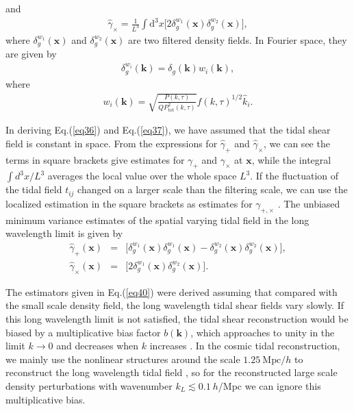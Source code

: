 \documentclass[aps,prd,twocolumn,showpacs,superscriptaddress,groupedaddress,nofootinbib]{revtex4}  %
\newcommand{\mr}{\mathrm}
\renewcommand{\d}{\mathrm{d}}
\begin{document}
and
\begin{eqnarray}
\label{eq37}
\hat{\gamma}_\times=\frac{1}{L^3}\int\d^3x
\big[2{\delta}^{w_1}_g(\bm{x}){\delta}^{w_2}_g(\bm{x})\big],
\end{eqnarray}
where ${\delta}^{w_1}_g(\bm{x})$ and ${\delta}^{w_2}_g(\bm{x})$ 
are two filtered density fields. In Fourier space, they are given by
\begin{eqnarray}
{\delta}_g^{w_i}(\bm{k})=\delta_g(\bm{k})w_i(\bm{k}),
\end{eqnarray}
where 
\begin{eqnarray}
\label{eq:filter}
w_i(\bm{k})=\sqrt{\frac{P(k,\tau)}{QP^2_\mr{tot}(k,\tau)}}
f(k,\tau)^{1/2}
\hat{k}_i.
\end{eqnarray}


In deriving Eq.(\ref{eq36}) and Eq.(\ref{eq37}), we have assumed that the tidal 
shear field is constant in space. 
From the expressions for $\hat{\gamma}_+$ and $\hat{\gamma}_\times$, we can 
see the terms in square brackets give estimates for $\gamma_+$ and 
$\gamma_\times$ at $\bm{x}$, while the integral $\int d^3x/L^3$ averages the 
local value over the whole space $L^3$.
If the fluctuation of the tidal field $t_{ij}$ changed on a larger scale than the filtering scale, 
we can use the localized estimation in the square brackets as estimates
for $\gamma_{+,\times}$ \cite{2008:lu,2010lu,2012bucher}. 
The unbiased minimum variance 
estimates of the spatial varying tidal field in the long wavelength limit is given by
\begin{eqnarray}
\label{eq40}
\hat{\gamma}_+(\bm{x})&=&
\big[{\delta}^{w_1}_g(\bm{x}){\delta}^{w_1}_g(\bm{x})-
{\delta}^{w_2}_g(\bm{x}){\delta}^{w_2}_g(\bm{x})\big],\nonumber\\
\hat{\gamma}_\times(\bm{x})&=&
\big[2{\delta}^{w_1}_g(\bm{x}){\delta}^{w_2}_g(\bm{x})\big].
\end{eqnarray}

The estimators given in Eq.(\ref{eq40}) were derived assuming that compared with the small scale density field, the long wavelength tidal shear fields vary slowly.  If this long wavelength 
limit is not satisfied, the tidal shear reconstruction would be biased by a 
multiplicative bias factor $b(\bm{k})$, which approaches to unity in the limit
$k\to0$ and decreases when $k$ increases \cite{2008:lu,2012bucher}. 
In the cosmic tidal reconstruction, we mainly use the nonlinear structures 
around the scale $1.25\ \mr{Mpc}/h$ to reconstruct the long wavelength tidal 
field \cite{2012:pen}, so for the reconstructed large scale density 
perturbations with wavenumber $k_L\lesssim0.1\ h$/Mpc we can ignore this 
multiplicative bias. 
\end{document}
